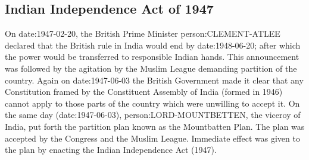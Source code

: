 \begin{multicol}{2}
\subsection{Indian Independence Act of 1947}

On \gls{date:1947-02-20}, the British Prime Minister \gls{person:CLEMENT-ATLEE} declared that the British rule in India would end by \gls{date:1948-06-20}; after which the power would be transferred to responsible Indian hands. This announcement was followed by the agitation by the Muslim League demanding partition of the country. Again on \gls{date:1947-06-03} the British Government made it clear that any Constitution framed by the Constituent Assembly of India (formed in 1946) cannot apply to those parts of the country which were unwilling to accept it. On the same day (\gls{date:1947-06-03}), \gls{person:LORD-MOUNTBETTEN}, the viceroy of India, put forth the partition plan known as the Mountbatten Plan. The plan was accepted by the Congress and the Muslim League. Immediate effect was given to the plan by enacting the Indian Independence Act (1947).


\end{multicol}
